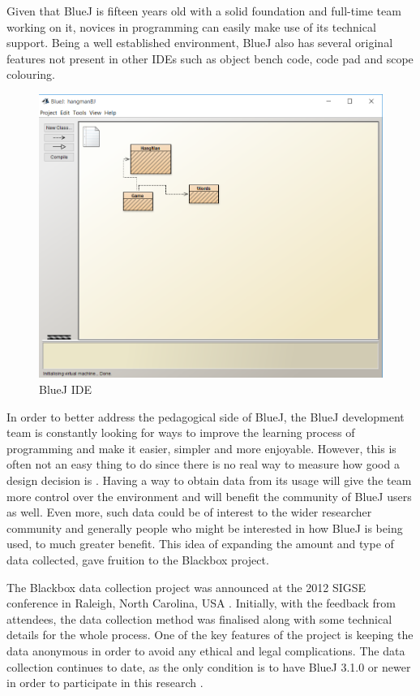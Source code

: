 Given that BlueJ is fifteen years old with a solid foundation and full-time team working on it, novices in programming can easily make use of its technical support. Being a well established environment, BlueJ also has several original features not present in other IDEs such as object bench code, code pad and scope colouring.	

\begin{figure}[H]
\begin{center}
\includegraphics[scale=0.45]{./pics/BlueJ_overview.png}
\caption{BlueJ IDE}
\label{fig:bluej_overview}
\end{center}
\end{figure}

In order to better address the pedagogical side of BlueJ, the BlueJ development team is constantly looking for ways to improve the learning process of programming and make it easier, simpler and more enjoyable. However, this is often not an easy thing to do since there is no real way to measure how good a design decision is \cite{bluej_blackbox}. Having a way to obtain data from its usage will give the team more control over the environment and will benefit the community of BlueJ users as well. Even more, such data could be of interest to the wider researcher community and generally people who might be interested in how BlueJ is being used, to much greater benefit. This idea of expanding the amount and type of data collected, gave fruition to the Blackbox project.

The Blackbox data collection project was announced at the 2012 SIGSE conference in Raleigh, North Carolina, USA \cite{bluej_blackbox}. Initially, with the feedback from attendees, the data collection method was finalised along with some technical details for the whole process. One of the key features of the project is keeping the data anonymous in order to avoid any ethical and legal complications. The data collection continues to date, as the only condition is to have BlueJ 3.1.0 or newer in order to participate in this research \cite{bluej_blackbox2}.

